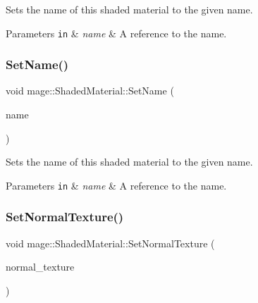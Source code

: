 Sets the name of this shaded material to the given name.


\begin{DoxyParams}[1]{Parameters}
\mbox{\tt in}  & {\em name} & A reference to the name. \\
\hline
\end{DoxyParams}
\hypertarget{structmage_1_1_shaded_material_aa2a120f4df21d5fbde733ce12a348571}{}\label{structmage_1_1_shaded_material_aa2a120f4df21d5fbde733ce12a348571} 
\subsubsection{\texorpdfstring{Set\+Name()}{SetName()}\hspace{0.1cm}{\footnotesize\ttfamily [2/2]}}
{\footnotesize\ttfamily void mage\+::\+Shaded\+Material\+::\+Set\+Name (\begin{DoxyParamCaption}\item[{string \&\&}]{name }\end{DoxyParamCaption})}

Sets the name of this shaded material to the given name.


\begin{DoxyParams}[1]{Parameters}
\mbox{\tt in}  & {\em name} & A reference to the name. \\
\hline
\end{DoxyParams}
\hypertarget{structmage_1_1_shaded_material_a681531e5a979ebdc4a0e8933a2439c0f}{}\label{structmage_1_1_shaded_material_a681531e5a979ebdc4a0e8933a2439c0f} 
\subsubsection{\texorpdfstring{Set\+Normal\+Texture()}{SetNormalTexture()}}
{\footnotesize\ttfamily void mage\+::\+Shaded\+Material\+::\+Set\+Normal\+Texture (\begin{DoxyParamCaption}\item[{\hyperlink{namespacemage_a1e01ae66713838a7a67d30e44c67703e}{Shared\+Ptr}$<$ \hyperlink{classmage_1_1_texture}{Texture} $>$}]{normal\+\_\+texture }\end{DoxyParamCaption})}

